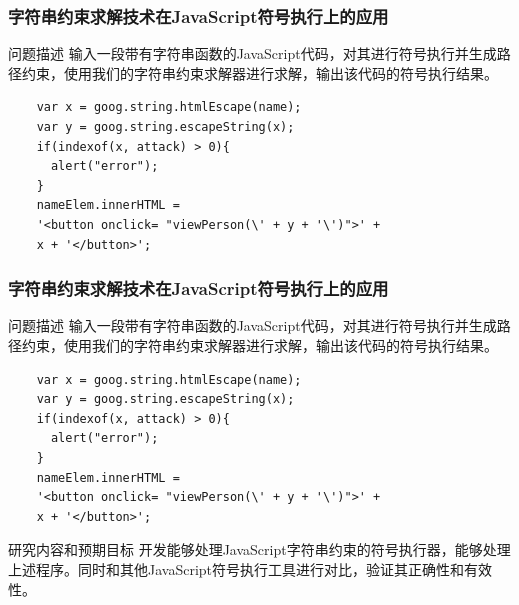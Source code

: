 \documentclass[landscape]{beamer}
\begin{document}
\begin{frame}[fragile, t]
  \frametitle{字符串约束求解技术在JavaScript符号执行上的应用}
  \begin{block}{问题描述}
    输入一段带有字符串函数的JavaScript代码，对其进行符号执行并生成路径约束，使用我们的字符串约束求解器进行求解，输出该代码的符号执行结果。
  \end{block}
  \begin{lstlisting}
    var x = goog.string.htmlEscape(name);
    var y = goog.string.escapeString(x);
    if(indexof(x, attack) > 0){
      alert("error");
    }
    nameElem.innerHTML =
    '<button onclick= "viewPerson(\' + y + '\')">' +
    x + '</button>';
  \end{lstlisting}

\end{frame}
\begin{frame}[fragile, t]
  \frametitle{字符串约束求解技术在JavaScript符号执行上的应用}
  \begin{block}{问题描述}
    输入一段带有字符串函数的JavaScript代码，对其进行符号执行并生成路径约束，使用我们的字符串约束求解器进行求解，输出该代码的符号执行结果。
  \end{block}
  \begin{lstlisting}
    var x = goog.string.htmlEscape(name);
    var y = goog.string.escapeString(x);
    if(indexof(x, attack) > 0){
      alert("error");
    }
    nameElem.innerHTML =
    '<button onclick= "viewPerson(\' + y + '\')">' +
    x + '</button>';
  \end{lstlisting}
  \begin{block}{研究内容和预期目标}
    开发能够处理JavaScript字符串约束的符号执行器，能够处理上述程序。同时和其他JavaScript符号执行工具进行对比，验证其正确性和有效性。
  \end{block}
\end{frame}
\end{document}
